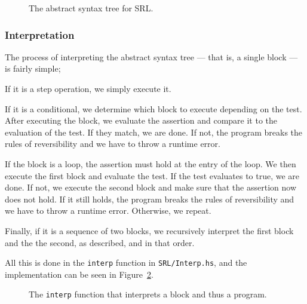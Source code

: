 \begin{figure}[H]
  
  \caption{The abstract syntax tree for SRL.}\label{fig:srlast}
\end{figure}


\subsubsection{Interpretation}

The process of interpreting the abstract syntax tree --- that is, a single block --- is fairly simple;

If it is a step operation, we simply execute it.

If it is a conditional, we determine which block to execute depending on the test. After executing the block, we evaluate the assertion and compare it to the evaluation of the test. If they match, we are done. If not, the program breaks the rules of reversibility and we have to throw a runtime error.

If the block is a loop, the assertion must hold at the entry of the loop. We then execute the first block and evaluate the test. If the test evaluates to true, we are done. If not, we execute the second block and make sure that the assertion now does not hold. If it still holds, the program breaks the rules of reversibility and we have to throw a runtime error. Otherwise, we repeat.

Finally, if it is a sequence of two blocks, we recursively interpret the first block and the the second, as described, and in that order.

All this is done in the \texttt{interp} function in \texttt{SRL/Interp.hs}, and the implementation can be seen in Figure~\ref{fig:srlinterp}.

\begin{figure}[H]
  
  \caption{The \texttt{interp} function that interprets a block and thus a program.}\label{fig:srlinterp}
\end{figure}
